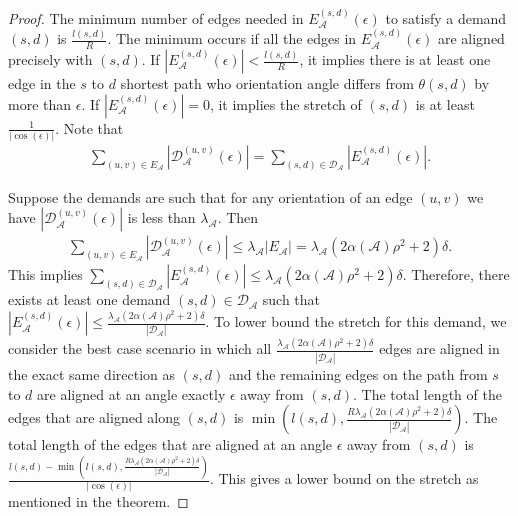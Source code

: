 \documentclass[acmsmall, screen]{acmart}
\begin{document}
\begin{proof}
The minimum number of edges needed in $E_\mathcal{A}^{(s,d)}(\epsilon)$  to satisfy a demand $(s, d)$ is $\frac{l(s,d)}{ R }$.
The minimum occurs if all the edges in $E_\mathcal{A}^{(s,d)}(\epsilon)$ are aligned precisely with $(s, d)$.
If $|E_\mathcal{A}^{(s,d)}(\epsilon)| < \frac{l(s,d)}{R}$, it implies there is at least one edge in the $s$ to $d$ shortest path who orientation angle differs from $\theta(s,d)$ by more than $\epsilon$. 
If $|E_\mathcal{A}^{(s,d)}(\epsilon)| = 0$, it implies the stretch of $(s, d)$ is at least $\frac{1}{ |\cos(\epsilon)| }$.  
Note that 
\begin{align}
\sum_{(u, v) \in E_\mathcal{A}} | \mathcal{D}_\mathcal{A}^{(u,v)}(\epsilon) | = \sum_{(s, d) \in \hat{\mathcal{D}}_\mathcal{A}} | E_\mathcal{A}^{(s, d)}(\epsilon)|.
\end{align}   

Suppose the demands are such that for any orientation of an edge $(u, v)$ we have $|\mathcal{D}_\mathcal{A}^{(u,v)}(\epsilon)|$ is less than $\lambda_\mathcal{A}$. 
Then 
\begin{align}
\sum_{(u, v) \in E_\mathcal{A}} | \mathcal{D}_\mathcal{A}^{(u,v)}(\epsilon) | \leq \lambda_\mathcal{A} |E_\mathcal{A}| = \lambda_\mathcal{A} (2\alpha(\mathcal{A}) \rho^2 + 2) \delta.
\end{align} 
This implies  $\sum_{(s, d) \in \mathcal{D}_\mathcal{A}} | E_\mathcal{A}^{(s, d)}(\epsilon)| \leq \lambda_\mathcal{A} (2\alpha(\mathcal{A}) \rho^2 + 2) \delta$.  
Therefore, there exists at least one demand $(s, d) \in \mathcal{D}_\mathcal{A}$ such that $|E_\mathcal{A}^{(s,d)}(\epsilon)| \leq \frac{\lambda_\mathcal{A} (2\alpha(\mathcal{A}) \rho^2 + 2) \delta}{ |\mathcal{D}_\mathcal{A}| }$.
To lower bound the stretch for this demand, we consider the best case scenario in which all $\frac{\lambda_\mathcal{A} (2\alpha(\mathcal{A}) \rho^2 + 2) \delta}{ |\mathcal{D}_\mathcal{A}| }$ edges are aligned in the exact same direction as $(s,d)$ and the remaining edges on the path from $s$ to $d$ are aligned at an angle exactly $\epsilon$ away from $(s,d)$.  
The total length of the edges that are aligned along $(s,d)$ is $ \min \left(l(s,d), \frac{R \lambda_\mathcal{A} (2\alpha(\mathcal{A}) \rho^2 + 2) \delta}{ |\mathcal{D}_\mathcal{A}|} \right) $.  
The total length of the edges that are aligned at an angle $\epsilon$ away from $(s,d)$ is $\frac{l(s,d) -   \min \left(l(s,d), \frac{R \lambda_\mathcal{A} (2 \alpha(\mathcal{A}) \rho^2 + 2) \delta}{ |\mathcal{D}_\mathcal{A}|} \right)}{|\cos(\epsilon)|}$.  
This gives a lower bound on the stretch as mentioned in the theorem.  
\end{proof} 
\end{document}
